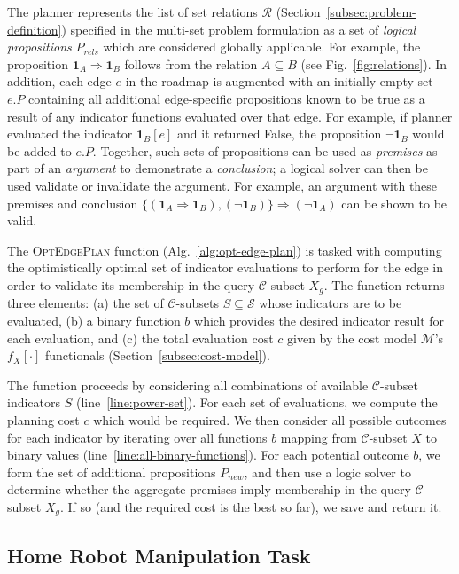 The planner represents the list of set relations $\mathcal{R}$
(Section~\ref{subsec:problem-definition})
specified in the multi-set problem formulation
as a set of \emph{logical propositions} $P_{rels}$
which are considered globally applicable.
For example,
the proposition $\mathbf{1}_A \Rightarrow \mathbf{1}_B$
follows from the relation $A \subseteq B$
(see Fig.~\ref{fig:relations}).
In addition,
each edge $e$ in the roadmap is augmented with an initially empty
set $e.P$ containing all additional edge-specific propositions
known to be true as a result of any indicator functions evaluated
over that edge.
For example,
if planner evaluated the indicator $\mathbf{1}_B[e]$
and it returned False,
the proposition $\lnot\mathbf{1}_B$ would be added to $e.P$.
Together, such sets of propositions can be used as \emph{premises}
as part of an \emph{argument} to demonstrate a \emph{conclusion};
a logical solver can then be used validate or invalidate the argument.
For example, an argument with these premises and conclusion
$\{ (\mathbf{1}_A \Rightarrow \mathbf{1}_B), (\lnot\mathbf{1}_B) \}
\Rightarrow (\lnot\mathbf{1}_A)$
can be shown to be valid.

The \textsc{OptEdgePlan} function (Alg.~\ref{alg:opt-edge-plan})
is tasked with computing
the optimistically optimal set of indicator evaluations to perform
for the edge in order to validate its membership in the query
$\mathcal{C}$-subset $X_g$.
The function returns three elements:
(a) the set of $\mathcal{C}$-subsets $S \subseteq \mathcal{S}$
whose indicators are to be evaluated,
(b) a binary function $b$
which provides the desired indicator result for each evaluation,
and (c) the total evaluation cost $c$
given by the cost model $\mathcal{M}$'s $f_X[\cdot]$ functionals
(Section~\ref{subsec:cost-model}).

The function proceeds by considering all combinations of
available $\mathcal{C}$-subset indicators $S$ (line~\ref{line:power-set}).
For each set of evaluations,
we compute the planning cost $c$ which would be required.
We then consider all possible outcomes for each indicator
by iterating over all functions $b$ mapping
from $\mathcal{C}$-subset $X$ to binary values
(line~\ref{line:all-binary-functions}).
For each potential outcome $b$,
we form the set of additional propositions $P_{new}$,
and then use a logic solver to determine whether the aggregate
premises imply membership in the query $\mathcal{C}$-subset $X_g$.
If so (and the required cost is the best so far),
we save and return it.

\subsection{Home Robot Manipulation Task}
\label{subsec:herb-experiment}

